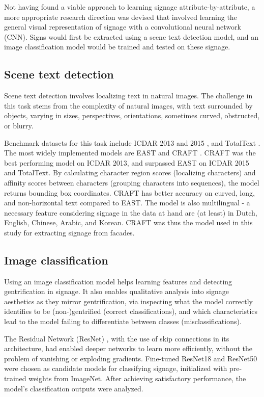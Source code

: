 Not having found a viable approach to learning signage attribute-by-attribute, a more appropriate research direction was devised that involved learning the general visual representation of signage with a convolutional neural network (CNN). Signs would first be extracted using a scene text detection model, and an image classification model would be trained and tested on these signage.

\subsection{Scene text detection}
Scene text detection involves localizing text in natural images. The challenge in this task stems from the complexity of natural images, with text surrounded by objects, varying in sizes, perspectives, orientations, sometimes curved, obstructed, or blurry.

Benchmark datasets for this task include ICDAR 2013 \cite{icdar13} and 2015 \cite{icdar15}, and TotalText \cite{totaltext}. The most widely implemented models are EAST \cite{zhou_east_2017} and CRAFT \cite{baek_character_2019}. CRAFT was the best performing model on ICDAR 2013, and surpassed EAST on ICDAR 2015 and TotalText. By calculating character region scores (localizing characters) and affinity scores between characters (grouping characters into sequences), the model returns bounding box coordinates. CRAFT has better accuracy on curved, long, and non-horizontal text compared to EAST. The model is also multilingual - a necessary feature considering signage in the data at hand are (at least) in Dutch, English, Chinese, Arabic, and Korean. CRAFT was thus the model used in this study for extracting signage from facades.


\subsection{Image classification}

Using an image classification model helps learning features and detecting gentrification in signage. It also enables qualitative analysis into signage aesthetics as they mirror gentrification, via inspecting what the model correctly identifies to be (non-)gentrified (correct classifications), and which characteristics lead to the model failing to differentiate between classes (misclassifications).

The Residual Network (ResNet) \cite{resnet}, with the use of skip connections in its architecture, had enabled deeper networks to learn more efficiently, without the problem of vanishing or exploding gradients. Fine-tuned ResNet18 and ResNet50 were chosen as candidate models for classifying signage, initialized with pre-trained weights from ImageNet. After achieving satisfactory performance, the model's classification outputs were analyzed. 

